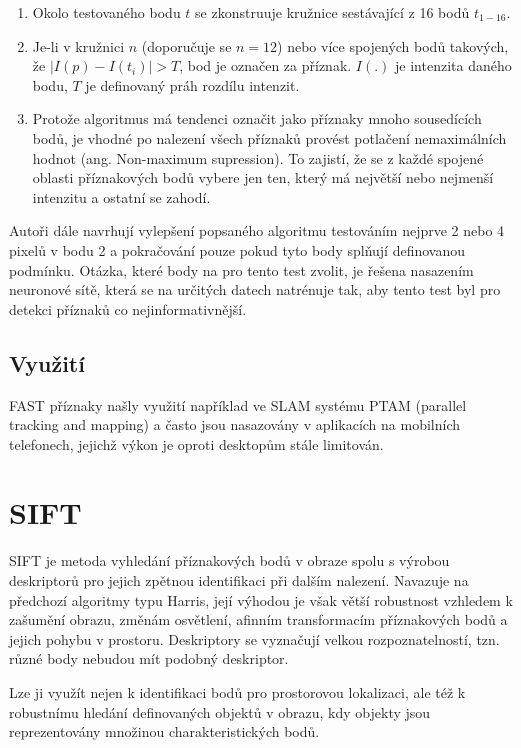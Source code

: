 		\begin{enumerate}
			\item Okolo testovaného bodu $t$ se zkonstruuje kružnice sestávající z 16 bodů $t_{1-16}$. 
			\item Je-li v kružnici $n$ (doporučuje se $n=12$) nebo více spojených bodů takových, že $\lvert I(p) - I(t_i) \rvert > T$, bod je označen za příznak. $I(.)$ je intenzita daného bodu, $T$ je definovaný práh rozdílu intenzit.
			\item Protože algoritmus má tendenci označit jako příznaky mnoho sousedících bodů, je vhodné po nalezení všech příznaků provést potlačení nemaximálních hodnot (ang. Non-maximum supression). To zajistí, že se z každé spojené oblasti příznakových bodů vybere jen ten, který má největší nebo nejmenší intenzitu a ostatní se zahodí.
		\end{enumerate}
		
		Autoři dále navrhují vylepšení popsaného algoritmu testováním nejprve 2 nebo 4 pixelů v bodu 2 a pokračování pouze pokud tyto body splňují definovanou podmínku. Otázka, které body na pro tento test zvolit, je řešena nasazením neuronové sítě, která se na určitých datech natrénuje tak, aby tento test byl pro detekci příznaků co nejinformativnější.
		
	\subsection{Využití}
	
		FAST příznaky našly využití například ve SLAM systému PTAM (parallel tracking and mapping) a často jsou nasazovány v aplikacích na mobilních telefonech, jejichž výkon je oproti desktopům stále limitován.	
	 

\section{SIFT}
	SIFT \cite{lowe2004distinctive} je metoda vyhledání příznakových bodů v obraze spolu s výrobou deskriptorů pro jejich zpětnou identifikaci při dalším nalezení. Navazuje na předchozí algoritmy typu Harris, její výhodou je však větší robustnost vzhledem k zašumění obrazu, změnám osvětlení, afinním transformacím příznakových bodů a jejich pohybu v prostoru. Deskriptory se vyznačují velkou rozpoznatelností, tzn. různé body nebudou mít podobný deskriptor.
	
	Lze ji využít nejen k identifikaci bodů pro prostorovou lokalizaci, ale též k robustnímu hledání definovaných objektů v obrazu, kdy objekty jsou reprezentovány množinou charakteristických bodů.
	

